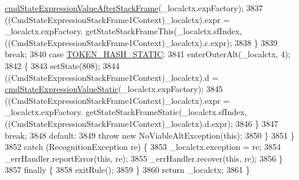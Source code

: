 \begin{DoxyCode}
      \hyperlink{classgov_1_1nasa_1_1jpf_1_1inspector_1_1server_1_1expression_1_1parser_1_1_expression_grammar_parser_a3c4b19fe3874c3c607c97ca475d31322}{cmdStateExpressionValueAfterStackFrame}(\_localctx.expFactory);
3837          ((CmdStateExpressionStackFrame1Context)\_localctx).expr =  \_localctx.expFactory.
      getStateStackFrameThis(\_localctx.sfIndex,   ((CmdStateExpressionStackFrame1Context)\_localctx).c.expr); 
3838         \}
3839         \textcolor{keywordflow}{break};
3840       \textcolor{keywordflow}{case} \hyperlink{classgov_1_1nasa_1_1jpf_1_1inspector_1_1server_1_1expression_1_1parser_1_1_expression_grammar_parser_a291146c24b193dc8ab6fbe0b40432881}{TOKEN\_HASH\_STATIC}:
3841         enterOuterAlt(\_localctx, 4);
3842         \{
3843         setState(808);
3844         ((CmdStateExpressionStackFrame1Context)\_localctx).d = 
      \hyperlink{classgov_1_1nasa_1_1jpf_1_1inspector_1_1server_1_1expression_1_1parser_1_1_expression_grammar_parser_abeaf7544d2fb53e23e913f8d829ba78e}{cmdStateExpressionValueStatic}(\_localctx.expFactory);
3845          ((CmdStateExpressionStackFrame1Context)\_localctx).expr =  \_localctx.expFactory.
      getStateStackFrameStatic(\_localctx.sfIndex, ((CmdStateExpressionStackFrame1Context)\_localctx).d.expr); 
3846         \}
3847         \textcolor{keywordflow}{break};
3848       \textcolor{keywordflow}{default}:
3849         \textcolor{keywordflow}{throw} \textcolor{keyword}{new} NoViableAltException(\textcolor{keyword}{this});
3850       \}
3851     \}
3852     \textcolor{keywordflow}{catch} (RecognitionException re) \{
3853       \_localctx.exception = re;
3854       \_errHandler.reportError(\textcolor{keyword}{this}, re);
3855       \_errHandler.recover(\textcolor{keyword}{this}, re);
3856     \}
3857     \textcolor{keywordflow}{finally} \{
3858       exitRule();
3859     \}
3860     \textcolor{keywordflow}{return} \_localctx;
3861   \}
\end{DoxyCode}
